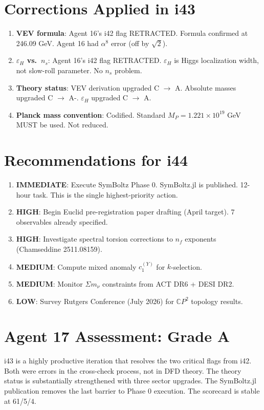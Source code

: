 \documentclass[11pt,a4paper]{article}
\newcommand{\CP}{\mathbb{C}P}
\begin{document}
\section{Corrections Applied in i43}

\begin{enumerate}
\item \textbf{VEV formula}: Agent 16's i42 flag RETRACTED. Formula confirmed at 246.09 GeV. Agent 16 had $\alpha^8$ error (off by $\sqrt{2}$).
\item \textbf{$\varepsilon_H$ vs.\ $n_s$}: Agent 16's i42 flag RETRACTED. $\varepsilon_H$ is Higgs localization width, not slow-roll parameter. No $n_s$ problem.
\item \textbf{Theory status}: VEV derivation upgraded C $\to$ A. Absolute masses upgraded C $\to$ A-. $\varepsilon_H$ upgraded C $\to$ A.
\item \textbf{Planck mass convention}: Codified. Standard $M_P = 1.221 \times 10^{19}$ GeV MUST be used. Not reduced.
\end{enumerate}

\section{Recommendations for i44}

\begin{enumerate}
\item \textbf{IMMEDIATE}: Execute SymBoltz Phase 0. SymBoltz.jl is published. 12-hour task. This is the single highest-priority action.
\item \textbf{HIGH}: Begin Euclid pre-registration paper drafting (April target). 7 observables already specified.
\item \textbf{HIGH}: Investigate spectral torsion corrections to $n_f$ exponents (Chamseddine 2511.08159).
\item \textbf{MEDIUM}: Compute mixed anomaly $c_1^{(Y)}$ for $k$-selection.
\item \textbf{MEDIUM}: Monitor $\Sigma m_\nu$ constraints from ACT DR6 + DESI DR2.
\item \textbf{LOW}: Survey Rutgers Conference (July 2026) for $\CP^2$ topology results.
\end{enumerate}

\section{Agent 17 Assessment: Grade A}

i43 is a highly productive iteration that resolves the two critical flags from i42. Both were errors in the cross-check process, not in DFD theory. The theory status is substantially strengthened with three sector upgrades. The SymBoltz.jl publication removes the last barrier to Phase 0 execution. The scorecard is stable at 61/5/4.
\end{document}
